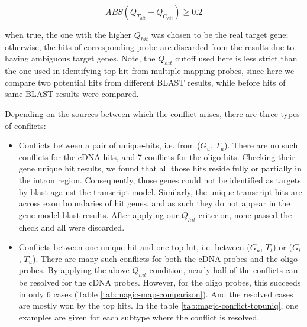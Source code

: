 \begin{equation}
ABS(Q_{T_{hit}}-Q_{G_{hit}}) \geq 0.2
\end{equation}

when true, the one with the higher $Q_{hit}$ was chosen to be the real target 
gene; 
otherwise, the hits of corresponding probe are discarded from the results due 
to having ambiguous target genes. 
Note, the $Q_{hit}$ cutoff used here is less strict than the one used in 
identifying top-hit from multiple mapping probes, since here we compare two 
potential hits from different BLAST results, while before hits of same BLAST 
results were compared.

Depending on the sources between which the conflict arises, there are three 
types of conflicts:

\begin{itemize}
\item Conflicts between a pair of unique-hits, i.e. from ($G_u$, $T_u$). There 
are no such conflicts for the cDNA hits, and 7 conflicts for the oligo hits. 
Checking their gene unique hit results, we found that all those hits reside 
fully or partially in the intron region. 
Consequently, those genes could not be identified as targets by blast against 
the transcript model. 
Similarly, the unique transcript hits are across exon boundaries of hit genes, 
and as such they do not appear in the gene model blast results. 
After applying our $Q_{hit}$ criterion, none passed the check and all  
were discarded. 

\item  Conflicts between one unique-hit and one top-hit, i.e. between ($G_u$, 
$T_t$) or ($G_t$, $T_u$). 
There are many such conflicts for both the cDNA probes and the oligo probes. 
By applying the above $Q_{hit}$ condition, nearly half of the conflicts can be 
resolved for the cDNA probes. 
However, for the oligo probes, this succeeds in only 6 cases (Table 
\ref{tab:magic-map-comparison}).
And the resolved cases are mostly won by the top hits.
In the table \ref{tab:magic-conflict-topuniq}, one examples are given for each 
subtype where the conflict is resolved. 



\end{itemize}
